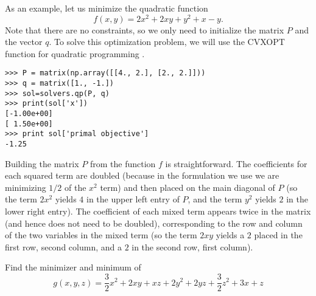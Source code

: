 As an example, let us minimize the quadratic function
\[
f(x,y) = 2x^2 +2xy + y^2 +x -y.
\]
Note that there are no constraints, so we only need to initialize the matrix $P$ and the vector $q$.
To solve this optimization problem, we will use the CVXOPT function for quadratic programming .
\begin{lstlisting}
>>> P = matrix(np.array([[4., 2.], [2., 2.]]))
>>> q = matrix([1., -1.])
>>> sol=solvers.qp(P, q)
>>> print(sol['x'])
[-1.00e+00]
[ 1.50e+00]
>>> print sol['primal objective']
-1.25
\end{lstlisting}
Building the matrix $P$ from the function $f$ is straightforward. The coefficients for each squared term are doubled (because in the formulation we use we are minimizing $1/2$ of the $x^2$ term) and then placed on the main diagonal of $P$ (so the term $2x^2$ yields $4$ in the upper left entry of
$P$, and the term $y^2$ yields $2$ in the lower right entry).
The coefficient of each mixed term appears twice in the matrix (and hence does not need to be doubled), corresponding to the row and column of the two variables in the mixed term (so the term $2xy$ yields a $2$ placed in the first row, second column, and a $2$ in
the second row, first column). 

\begin{problem}
Find the minimizer and minimum of
\begin{equation*}
g(x,y,z) = \frac{3}{2}x^2 +2xy + xz+ 2y^2 +2yz+\frac{3}{2}z^2+3x + z
\end{equation*}
\begin{comment}
\begin{equation}
f(x) = \frac{1}{2}x\trp Qx - x\trp p
\end{equation}
where

\begin{center}
$Q =
\begin{bmatrix}
3 & 2 & 1\\
2 & 4 & 2\\
1 & 2 & 3\\
\end{bmatrix}
$
and $p =
\begin{bmatrix}
3\\
0\\
1\\
\end{bmatrix}
$
\end{center}
\end{comment}

\end{problem}


